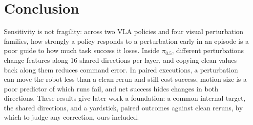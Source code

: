 \section{Conclusion}

Sensitivity is not fragility: across two VLA policies and four visual perturbation families, how strongly a policy responds to a perturbation early in an episode is a poor guide to how much task success it loses. Inside $\pi_{0.5}$, different perturbations change features along 16 shared directions per layer, and copying clean values back along them reduces command error. In paired executions, a perturbation can move the robot less than a clean rerun and still cost success, motion size is a poor predictor of which runs fail, and net success hides changes in both directions. These results give later work a foundation: a common internal target, the shared directions, and a yardstick, paired outcomes against clean reruns, by which to judge any correction, ours included.
